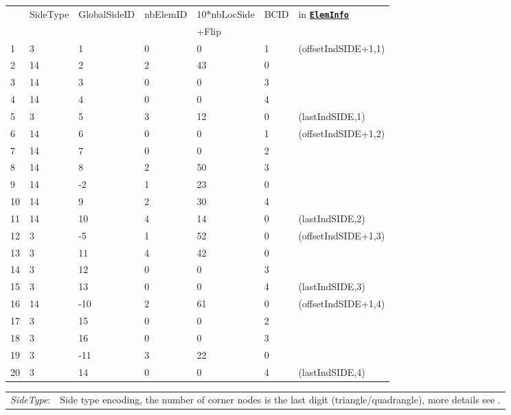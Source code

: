 \documentclass[a4paper,headsepline]{scrreprt}
\newcommand\rf[1]{\prettyref{#1}}
\newcommand\ttbf[1]{\texttt{\textbf{#1}}}
\newcommand\ElemInfo{\hyperlink{ElemInfo}{\ttbf{ElemInfo}}\xspace}
\newcommand\nSides{\ttbf{nSides}\xspace}
\begin{document}
\begin{table}[h!]
\centering
\begin{tabular}{|l|l|l|l|l|l||l|}
\hline
  & SideType & GlobalSideID & nbElemID & 10*nbLocSide   & BCID  & in \ElemInfo \\ 
  &          &        &          &  +Flip   &       &              \\\hline\hline
1  &  3 &  1 & 0 &  0 & 1 &  (offsetIndSIDE+1,1) \\ 
2  & 14 &  2 & 2 & 43 & 0 &  \\ 
3  & 14 &  3 & 0 &  0 & 3 &  \\ 
4  & 14 &  4 & 0 &  0 & 4 &  \\ 
5  &  3 &  5 & 3 & 12 & 0 &  (lastIndSIDE,1) \\ \hline 
6  & 14 &  6 & 0 &  0 & 1 &  (offsetIndSIDE+1,2) \\ 
7  & 14 &  7 & 0 &  0 & 2 &  \\ 
8  & 14 &  8 & 2 & 50 & 3 &  \\ 
9  & 14 & -2 & 1 & 23 & 0 &  \\ 
10 & 14 &  9 & 2 & 30 & 4 &  \\ 
11 & 14 & 10 & 4 & 14 & 0 &  (lastIndSIDE,2) \\ \hline
12 &  3 & -5 & 1 & 52 & 0 &  (offsetIndSIDE+1,3) \\ 
13 &  3 & 11 & 4 & 42 & 0 &  \\ 
14 &  3 & 12 & 0 &  0 & 3 &  \\ 
15 &  3 & 13 & 0 &  0 & 4 &  (lastIndSIDE,3) \\ \hline%
16 & 14 &-10 & 2 & 61 & 0 &  (offsetIndSIDE+1,4) \\ 
17 &  3 & 15 & 0 &  0 & 2 &  \\ 
18 &  3 & 16 & 0 &  0 & 3 &  \\ 
19 &  3 &-11 & 3 & 22 & 0 &  \\ 
20 &  3 & 14 & 0 &  0 & 4 &  (lastIndSIDE,4) \\ \hline%
\end{tabular}\vspace{2ex}
\begin{tabularx}{1.0\textwidth}{|lX|}\hline
\emph{SideType}:        & Side type encoding, the number of corner nodes is the last digit (triangle/quadrangle), more details see \rf{sec:elemtypes}. \\

\end{tabularx}
\end{table}
\end{document}
